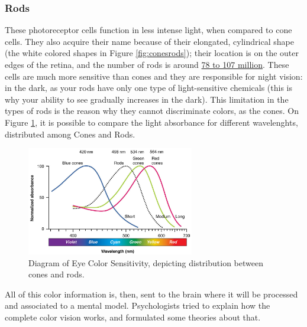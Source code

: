 \documentclass{report}
\begin{document}
\subsubsection{Rods}
These photoreceptor cells function in less intense light, when compared to cone cells. They also acquire
their name because of their elongated, cylindrical shape (the white colored shapes in Figure \ref{fig:conesrods});
their location is on the outer edges of the retina, and the number of rods is around \underline{78 to 107 million}. These
cells are much more sensitive than
cones and they are responsible for night vision: in the dark, as your rods have only one type of light-sensitive chemicals (this is why your ability to see gradually increases in the dark). This limitation in the types of rods is the
reason why they cannot discriminate colors, as the cones. On Figure \ref{fig:colorsensitivity}, it is possible to compare
the light absorbance for different wavelenghts, distributed among Cones and Rods. \\ \par
%
\begin{figure}[H]
	\centering
    \vspace{-15pt}
    \includegraphics[width=0.65\textwidth]{Eye_Color_Sensitivity.jpg}
    \caption[Diagram of Eye Color Sensitivity]{Diagram of Eye Color Sensitivity, depicting distribution between cones and rods.\protect\footnotemark{}}
    \vspace{-15pt}
    \label{fig:colorsensitivity}
\end{figure}
%
All of this color information is, then, sent to the brain where it will be processed and associated to a
mental model. Psychologists tried to explain how the complete color vision works, and formulated some
theories about that.
%
\end{document}
